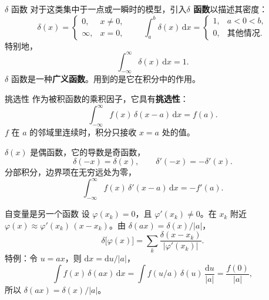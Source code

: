 \documentclass[fontset=windows, chinese, 10pt, xcolor=dvipsnames]{beamer}
\begin{document}
\begin{frame}{$\delta$ 函数}
  对于这类集中于一点或一瞬时的模型，引入\textbf{$\delta$ 函数}以描述其密度：
  \begin{equation*}
    \delta(x)=\begin{cases}
      0, & x\neq 0,\\
      \infty, & x=0,
    \end{cases}
    \qquad
    \int_a^b\delta(x)\,\mathrm{d}x
    =\begin{cases}
      1, & a<0<b,\\
      0, & \text{其他情况}.
    \end{cases}
  \end{equation*}
  特别地，
  \begin{equation*}
    \int_{-\infty}^{\infty}\delta(x)\,\mathrm{d}x=1.
  \end{equation*}
  $\delta$ 函数是一种\textbf{广义函数}。用到的是它在积分中的作用。
\end{frame}

\begin{frame}{挑选性}
  作为被积函数的乘积因子，它具有\textbf{挑选性}：
  \begin{equation*}
    \int_{-\infty}^{\infty} f(x)\,\delta(x-a)\,\mathrm{d}x=f(a).
  \end{equation*}
  $f$ 在 $a$ 的邻域里连续时，积分只接收 $x=a$ 处的值。
  \vspace{0.4em}

  $\delta(x)$ 是偶函数，它的导数是奇函数，
  \begin{equation*}
    \delta(-x)=\delta(x),
    \qquad
    \delta'(-x)=-\delta'(x).
  \end{equation*}
  分部积分，边界项在无穷远处为零，
  \begin{equation*}
    \int_{-\infty}^{\infty} f(x)\,\delta'(x-a)\,\mathrm{d}x
    =-f'(a).
  \end{equation*}
\end{frame}

\begin{frame}{自变量是另一个函数}
  设 $\varphi(x_k)=0$，且 $\varphi'(x_k)\neq 0$。在 $x_k$ 附近
  $\varphi(x)\approx\varphi'(x_k)\,(x-x_k)$。由 $\delta(ax)=\delta(x)/|a|$，
  \begin{equation*}
    \delta\bigl[\varphi(x)\bigr]
    =\sum_k\frac{\delta(x-x_k)}{|\varphi'(x_k)|}.
  \end{equation*}
  特例：令 $u=ax$，则 $\mathrm{d}x=\mathrm{d}u/|a|$，
  \begin{equation*}
    \int f(x)\,\delta(ax)\,\mathrm{d}x
    =\int f(u/a)\,\delta(u)\,\frac{\mathrm{d}u}{|a|}
    =\frac{f(0)}{|a|},
  \end{equation*}
  所以 $\delta(ax)=\delta(x)/|a|$。
\end{frame}
\end{document}
